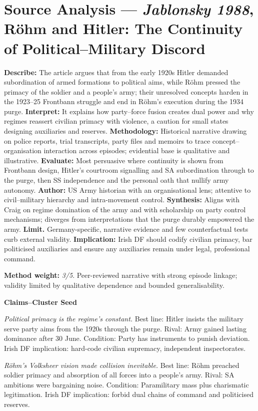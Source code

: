 \section*{Source Analysis — \textit{Jablonsky 1988}, Röhm and Hitler: The Continuity of Political–Military Discord}
\textbf{Describe:} The article argues that from the early 1920s Hitler demanded subordination of armed formations to political aims, while Röhm pressed the primacy of the soldier and a people’s army; their unresolved concepts harden in the 1923–25 Frontbann struggle and end in Röhm’s execution during the 1934 purge.
\textbf{Interpret:} It explains how party–force fusion creates dual power and why regimes reassert civilian primacy with violence, a caution for small states designing auxiliaries and reserves.
\textbf{Methodology:} Historical narrative drawing on police reports, trial transcripts, party files and memoirs to trace concept–organisation interaction across episodes; evidential base is qualitative and illustrative.
\textbf{Evaluate:} Most persuasive where continuity is shown from Frontbann design, Hitler’s courtroom signalling and SA subordination through to the purge, then SS independence and the personal oath that nullify army autonomy.
\textbf{Author:} US Army historian with an organisational lens; attentive to civil–military hierarchy and intra-movement control.
\textbf{Synthesis:} Aligns with Craig on regime domination of the army and with scholarship on party control mechanisms; diverges from interpretations that the purge durably empowered the army.
\textbf{Limit.} Germany-specific, narrative evidence and few counterfactual tests curb external validity.
\textbf{Implication:} Irish DF should codify civilian primacy, bar politicised auxiliaries and ensure any auxiliaries remain under legal, professional command.

\textbf{Method weight:} \textit{3/5}. Peer-reviewed narrative with strong episode linkage; validity limited by qualitative dependence and bounded generalisability.

\textbf{Claims–Cluster Seed}

\textit{Political primacy is the regime’s constant.}
Best line: Hitler insists the military serve party aims from the 1920s through the purge.
Rival: Army gained lasting dominance after 30 June.
Condition: Party has instruments to punish deviation.
Irish DF implication: hard-code civilian supremacy, independent inspectorates.

\textit{Röhm’s Volksheer vision made collision inevitable.}
Best line: Röhm preached soldier primacy and absorption of all forces into a people’s army.
Rival: SA ambitions were bargaining noise.
Condition: Paramilitary mass plus charismatic legitimation.
Irish DF implication: forbid dual chains of command and politicised reserves.

